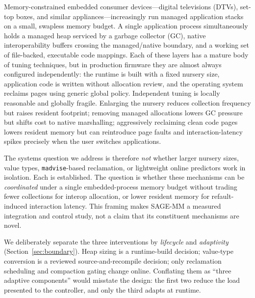 \documentclass[acmsmall,screen]{acmart}
\begin{document}
Memory-constrained embedded consumer devices---digital televisions (DTVs),
set-top boxes, and similar appliances---increasingly run managed
application stacks on a small, swapless memory budget. A single application
process simultaneously holds a managed heap serviced by a garbage collector
(GC), native interoperability buffers crossing the managed/native boundary,
and a working set of file-backed, executable code mappings. Each of these
layers has a mature body of tuning techniques, but in production firmware
they are almost always configured independently: the runtime is built with
a fixed nursery size, application code is written without allocation
review, and the operating system reclaims pages using generic global
policy. Independent tuning is locally reasonable and globally fragile.
Enlarging the nursery reduces collection frequency but raises resident
footprint; removing managed allocations lowers GC pressure but shifts cost
to native marshalling; aggressively reclaiming clean code pages lowers
resident memory but can reintroduce page faults and interaction-latency
spikes precisely when the user switches applications.

The systems question we address is therefore \emph{not} whether larger
nursery sizes, value types, \texttt{madvise}-based reclamation, or
lightweight online predictors work in isolation. Each is established. The
question is whether these mechanisms can be \emph{coordinated} under a
single embedded-process memory budget without trading fewer collections
for interop allocation, or lower resident memory for refault-induced
interaction latency. This framing makes SAGE-MM a measured integration and
control study, not a claim that its constituent mechanisms are novel.

We deliberately separate the three interventions by \emph{lifecycle} and
\emph{adaptivity} (Section~\ref{sec:boundary}). Heap sizing is a
runtime-build decision; value-type conversion is a reviewed
source-and-recompile decision; only reclamation scheduling and compaction
gating change online. Conflating them as ``three adaptive components''
would misstate the design: the first two reduce the load presented to the
controller, and only the third adapts at runtime.
\end{document}
